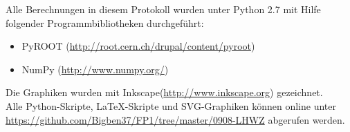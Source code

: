 \documentclass[12pt, a4paper]{scrartcl}
\title{\exptitle}
\subtitle{Fortgeschrittenen-Praktikum 1}
\author{Moritz Bitterling und Benjamin Rottler \\ Universität Freiburg}
\date{\expdate}
\numberwithin{equation}{section} %
\numberwithin{table}{section}    %
\begin{document}
\hypersetup{pageanchor=false} %

\thispagestyle{empty}

\newpage
Alle Berechnungen in diesem Protokoll wurden unter Python 2.7 mit Hilfe folgender Programmbibliotheken durchgeführt:
\begin{itemize}
  \item PyROOT (\url{http://root.cern.ch/drupal/content/pyroot})
  \item NumPy (\url{http://www.numpy.org/})
\end{itemize}
Die Graphiken wurden mit Inkscape(\url{http://www.inkscape.org}) gezeichnet.\\[\baselineskip]
Alle Python-Skripte, \LaTeX-Skripte und SVG-Graphiken können online unter \\
\url{https://github.com/Bigben37/FP1/tree/master/0908-LHWZ} abgerufen werden.
\thispagestyle{empty}

\newpage
\tableofcontents
\thispagestyle{empty}

\newpage
\hypersetup{pageanchor=true} %
\setcounter{page}{1} %

 




\end{document}
